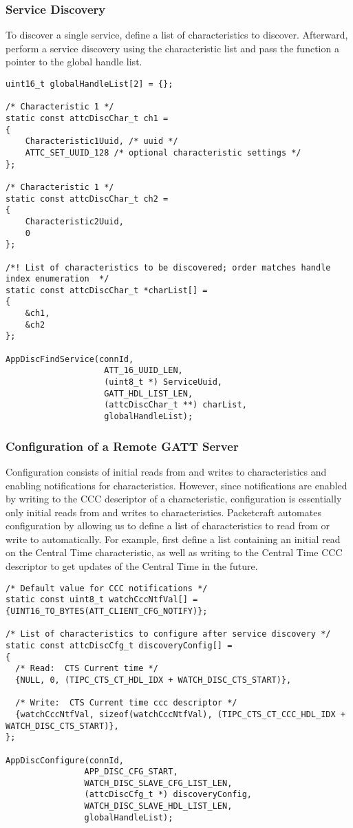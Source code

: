 \subsubsection{Service Discovery}
To discover a single service, define a list of characteristics to discover. Afterward, perform a service discovery using the characteristic list and pass the function a pointer to the global handle list.
\begin{lstlisting}
uint16_t globalHandleList[2] = {};

/* Characteristic 1 */
static const attcDiscChar_t ch1 =
{
    Characteristic1Uuid, /* uuid */
    ATTC_SET_UUID_128 /* optional characteristic settings */
};

/* Characteristic 1 */
static const attcDiscChar_t ch2 =
{
    Characteristic2Uuid,
    0
};

/*! List of characteristics to be discovered; order matches handle index enumeration  */
static const attcDiscChar_t *charList[] =
{
    &ch1,
    &ch2
};

AppDiscFindService(connId, 
                    ATT_16_UUID_LEN, 
                    (uint8_t *) ServiceUuid,
                    GATT_HDL_LIST_LEN, 
                    (attcDiscChar_t **) charList, 
                    globalHandleList);
\end{lstlisting}

\subsubsection{Configuration of a Remote GATT Server}
Configuration consists of initial reads from and writes to characteristics and enabling notifications for characteristics. However, since notifications are enabled by writing to the CCC descriptor of a characteristic, configuration is essentially only initial reads from and writes to characteristics. Packetcraft automates configuration by allowing us to define a list of characteristics to read from or write to automatically. For example, first define a list containing an initial read on the Central Time characteristic, as well as writing to the Central Time CCC descriptor to get updates of the Central Time in the future.
\begin{lstlisting}
/* Default value for CCC notifications */
static const uint8_t watchCccNtfVal[] = {UINT16_TO_BYTES(ATT_CLIENT_CFG_NOTIFY)};

/* List of characteristics to configure after service discovery */
static const attcDiscCfg_t discoveryConfig[] =
{
  /* Read:  CTS Current time */
  {NULL, 0, (TIPC_CTS_CT_HDL_IDX + WATCH_DISC_CTS_START)},

  /* Write:  CTS Current time ccc descriptor */
  {watchCccNtfVal, sizeof(watchCccNtfVal), (TIPC_CTS_CT_CCC_HDL_IDX + WATCH_DISC_CTS_START)},
};

AppDiscConfigure(connId, 
                APP_DISC_CFG_START, 
                WATCH_DISC_SLAVE_CFG_LIST_LEN,
                (attcDiscCfg_t *) discoveryConfig,
                WATCH_DISC_SLAVE_HDL_LIST_LEN, 
                globalHandleList);
\end{lstlisting}

